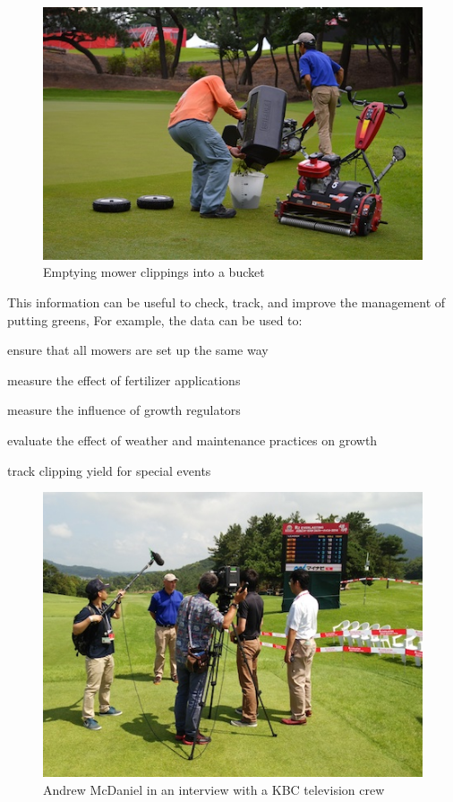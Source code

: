 \documentclass[12pt,b5,]{tufte-book}
\begin{document}
\begin{figure}
\centering
\includegraphics{img/b1-2.png}
\caption{Emptying mower clippings into a bucket}
\end{figure}

This information can be useful to check, track, and improve the management of putting greens, For example, the data can be used to:

ensure that all mowers are set up the same way

measure the effect of fertilizer applications

measure the influence of growth regulators

evaluate the effect of weather and maintenance practices on growth

track clipping yield for special events

\begin{figure}
\centering
\includegraphics{img/b1-3.png}
\caption{Andrew McDaniel in an interview with a KBC television crew}
\end{figure}
\end{document}

